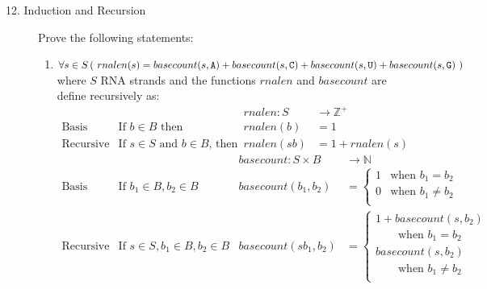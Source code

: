 \begin{description}
  
  \item[12. Induction and Recursion] 
  
  Prove the following statements:
  
  \begin{enumerate}
  
  \item[(a)] $\forall s \in S \, (~rnalen(s) = basecount(s,\texttt{A}) + basecount(s,\texttt{C}) + basecount(s,\texttt{U}) + basecount(s,\texttt{G})~)$ where $S$ RNA strands and the functions $rnalen$ and $basecount$ are define recursively as: 
  \hspace{-1in}
  \[
  \begin{array}{llll}
  & & \textit{rnalen} : S & \to \mathbb{Z}^+ \\
  \textrm{Basis Step:} & \textrm{If } b \in B\textrm{ then } & \textit{rnalen}(b) & = 1 \\
  \textrm{Recursive Step:} & \textrm{If } s \in S\textrm{ and }b \in B\textrm{, then  } & \textit{rnalen}(sb) & = 1 + \textit{rnalen}(s)
  \end{array}
  \]
  \[
  \begin{array}{llll}
  & & \textit{basecount} : S \times B & \to \mathbb{N} \\
  \textrm{Basis Step:} &  \textrm{If } b_1 \in B, b_2 \in B & \textit{basecount}(b_1, b_2) & =
          \begin{cases}
              1 & \textrm{when } b_1 = b_2 \\
              0 & \textrm{when } b_1 \neq b_2 \\
          \end{cases} \\
  \textrm{Recursive Step:} & \textrm{If } s \in S, b_1 \in B, b_2 \in B &\textit{basecount}(s b_1, b_2) & =
          \begin{cases}
              1 + \textit{basecount}(s, b_2) & \\
              \qquad \textrm{when } b_1 = b_2 &\\
              \textit{basecount}(s, b_2) & \\
              \qquad \textrm{when } b_1 \neq b_2 &\\
          \end{cases}
  \end{array}
  \]
  
  \ifsolution
\end{enumerate}
\end{description}
